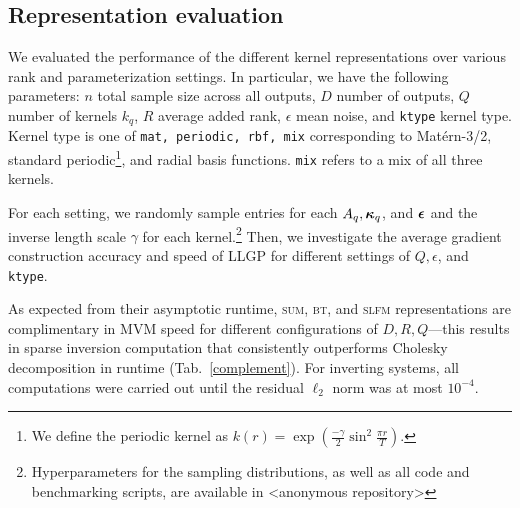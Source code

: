 \documentclass{article}
\begin{document}
\subsection{Representation evaluation}\label{empirical-rep}

We evaluated the performance of the different kernel representations over various rank and parameterization settings. In particular, we have the following parameters: $n$ total sample size across all outputs, $D$ number of outputs, $Q$ number of kernels $k_q$, $R$ average added rank, $\epsilon$ mean noise, and \texttt{ktype} kernel type. Kernel type is one of \texttt{mat, periodic, rbf, mix} corresponding to Mat\'{e}rn-3/2, standard periodic\footnote{We define the periodic kernel as $k(r) = \exp \left(\frac{-\gamma}{2}\sin^2\frac{\pi r}{T}\right)$.}, and radial basis functions. \texttt{mix} refers to a mix of all three kernels.

For each setting, we randomly sample entries for each $A_q,{\boldsymbol\kappa}_q$, and ${\boldsymbol\epsilon}$ and the inverse length scale $\gamma$ for each kernel.\footnote{Hyperparameters for the sampling distributions, as well as all code and benchmarking scripts, are available in <anonymous repository>} Then, we investigate the average gradient construction accuracy and speed of LLGP for different settings of $Q,\epsilon$, and \texttt{ktype}.


As expected from their asymptotic runtime, \textsc{sum}, \textsc{bt}, and \textsc{slfm} representations are complimentary in MVM speed for different configurations of $D,R,Q$---this results in sparse inversion computation that consistently outperforms Cholesky decomposition in runtime (Tab.~\ref{complement}).
For inverting systems, all computations were carried out until the residual $\ell_2$ norm was at most $10^{-4}$.
\begin{table}[!h]
  \caption{The runtime in seconds for solving $K\Tx=\Ty$ for a random kernel $K$ constructed as in Sec.~\ref{empirical-rep} using \textsc{minres} for each of the kernel representations. For comparison, the \textsc{chol} representation is wallclock time to compute the Cholesky decomposition of the matrix, which must be constructed, and use this decomposition to invert the system. We averaged over five runs. In every run, we use $n=5000$ simulated data points, $\texttt{mix}$ kernels, and $\epsilon=0.1$.
}
\label{complement}
\begin{center}
  \begin{small}
    
\end{small}
\end{center}
\end{table}
\end{document}
